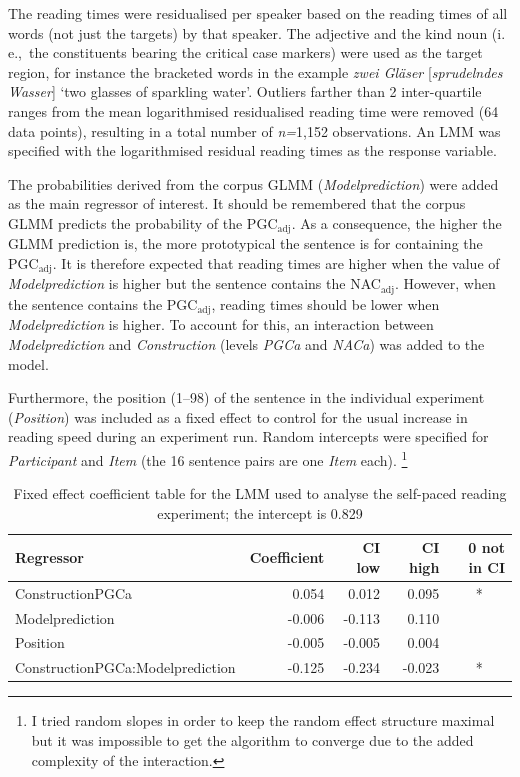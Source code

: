 \documentclass[USenglish]{article}
\newcommand{\ie}{i.\,e.,}
\newcommand{\Sub}[1]{\ensuremath{\mathrm{_{#1}}}}
\newcommand{\NACa}{NAC\Sub{adj}}
\newcommand{\PGCa}{PGC\Sub{adj}}
\begin{document}
The reading times were residualised per speaker based on the reading times of all words (not just the targets) by that speaker.
The adjective and the kind noun (\ie\ the constituents bearing the critical case markers) were used as the target region, for instance the bracketed words in the example \textit{zwei Gläser} [\textit{spru\-deln\-des Wasser}] `two glasses of sparkling water'.
Outliers farther than 2 inter-quartile ranges from the mean logarithmised residualised reading time were removed (64 data points), resulting in a total number of \textit{n=}1,152 observations.
An LMM was specified with the logarithmised residual reading times as the response variable.

The probabilities derived from the corpus GLMM (\textit{Modelprediction}) were added as the main regressor of interest.
It should be remembered that the corpus GLMM predicts the probability of the \PGCa.
As a consequence, the higher the GLMM prediction is, the more prototypical the sentence is for containing the \PGCa.
It is therefore expected that reading times are higher when the value of \textit{Modelprediction} is higher but the sentence contains the \NACa.
However, when the sentence contains the \PGCa, reading times should be lower when \textit{Modelprediction} is higher.
To account for this, an interaction between \textit{Modelprediction} and \textit{Construction} (levels \textit{PGCa} and \textit{NACa}) was added to the model.

Furthermore, the position (1--98) of the sentence in the individual experiment (\textit{Position}) was included as a fixed effect to control for the usual increase in reading speed during an experiment run.
Random intercepts were specified for \textit{Participant} and \textit{Item} (the 16 sentence pairs are one \textit{Item} each).%
\footnote{I tried random slopes in order to keep the random effect structure maximal \citep{BarrEa2013} but it was impossible to get the algorithm to converge due to the added complexity of the interaction.}

\begin{table}
  \centering
  \begin{tabular}{lrrrc}
    Regressor & \multicolumn{1}{r}{Coefficient} & \multicolumn{1}{r}{CI low} & \multicolumn{1}{r}{CI high} & \multicolumn{1}{r}{0 not in CI} \\ \midrule
    ConstructionPGCa                 &  0.054 &  0.012 &  0.095 &  *  \\ 
    Modelprediction                  & -0.006 & -0.113 &  0.110 &     \\ 
    Position                         & -0.005 & -0.005 &  0.004 &     \\ 
    ConstructionPGCa:Modelprediction & -0.125 & -0.234 & -0.023 &  *  \\ 
  \end{tabular}
  \caption{Fixed effect coefficient table for the LMM used to analyse the self-paced reading experiment; the intercept is 0.829}
  \label{tab:exp:spr}
\end{table}
\end{document}
